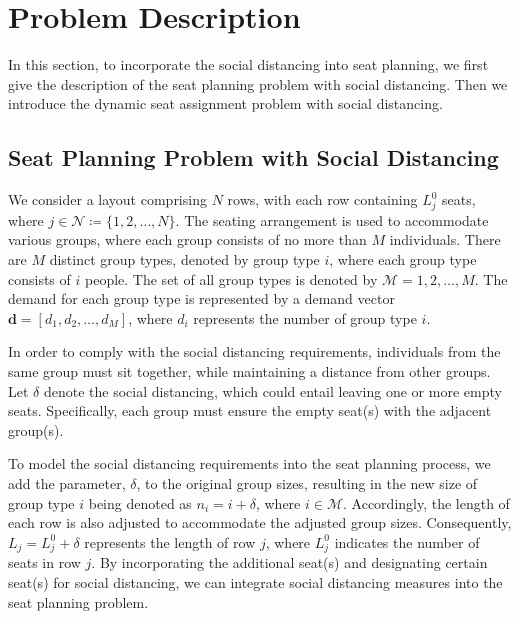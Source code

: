 \section{Problem Description}
In this section, to incorporate the social distancing into seat planning, we first give the description of the seat planning problem with social distancing. Then we introduce the dynamic seat assignment problem with social distancing.


\subsection{Seat Planning Problem with Social Distancing}\label{dynamic_demand}
We consider a layout comprising $N$ rows, with each row containing $L_j^0$ seats, where $j \in \mathcal{N} \coloneqq \{1,2, \ldots, N\}$. The seating arrangement is used to accommodate various groups, where each group consists of no more than $M$ individuals. There are $M$ distinct group types, denoted by group type $i$, where each group type consists of $i$ people. The set of all group types is denoted by $\mathcal{M} = {1, 2, \ldots, M}$. The demand for each group type is represented by a demand vector $\mathbf{d} = [d_1, d_2, \ldots, d_M]$, where $d_i$ represents the number of group type $i$.

In order to comply with the social distancing requirements, individuals from the same group must sit together, while maintaining a distance from other groups. Let $\delta$ denote the social distancing, which could entail leaving one or more empty seats. Specifically, each group must ensure the empty seat(s) with the adjacent group(s).


To model the social distancing requirements into the seat planning process, we add the parameter, $\delta$, to the original group sizes, resulting in the new size of group type $i$ being denoted as $n_i = i + \delta$, where $i \in \mathcal{M}$. Accordingly, the length of each row is also adjusted to accommodate the adjusted group sizes. Consequently, $L_j = L_j^{0} + \delta$ represents the length of row $j$, where $L_j^{0}$ indicates the number of seats in row $j$. By incorporating the additional seat(s) and designating certain seat(s) for social distancing, we can integrate social distancing measures into the seat planning problem.

